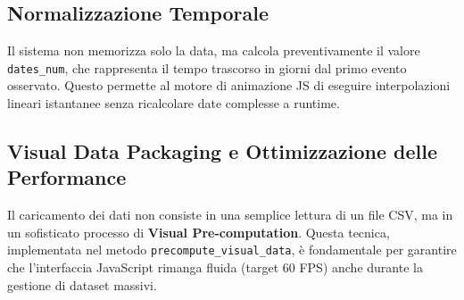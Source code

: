 \documentclass[12pt,a4paper]{article}
\begin{document}
\subsection{Normalizzazione Temporale}
Il sistema non memorizza solo la data, ma calcola preventivamente il valore \texttt{dates\_num}, che rappresenta il tempo trascorso in giorni dal primo evento osservato. Questo permette al motore di animazione JS di eseguire interpolazioni lineari istantanee senza ricalcolare date complesse a runtime.

\subsection{Visual Data Packaging e Ottimizzazione delle Performance}
Il caricamento dei dati non consiste in una semplice lettura di un file CSV, ma in un sofisticato processo di \textbf{Visual Pre-computation}. Questa tecnica, implementata nel metodo \texttt{precompute\_visual\_data}, è fondamentale per garantire che l'interfaccia JavaScript rimanga fluida (target 60 FPS) anche durante la gestione di dataset massivi.
\end{document}
